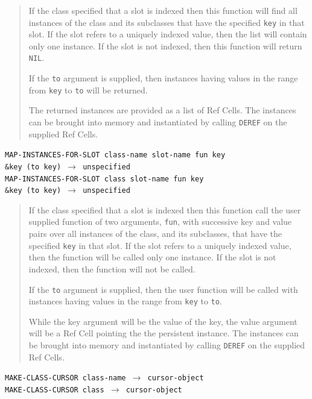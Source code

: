 \documentclass[article,oneside]{memoir}
\begin{document}
\begin{quote}
If the class specified that a slot is indexed then this function will find all instances of the class and its subclasses that have the specified \texttt{key} in that slot. If the slot refers to a uniquely indexed value, then the list will contain only one instance. If the slot is not indexed, then this function will return \texttt{NIL}. 

If the \texttt{to} argument is supplied, then instances having values in the range from \texttt{key} to \texttt{to} will be returned.

The returned instances are provided as a list of Ref Cells.  The instances can be brought into memory and instantiated by calling \texttt{DEREF} on the supplied Ref Cells.
\end{quote}

\noindent \texttt{MAP-INSTANCES-FOR-SLOT class-name slot-name fun key \\ \hspace*{10em} \&key (to key) $\rightarrow$ unspecified}\\
\noindent \texttt{MAP-INSTANCES-FOR-SLOT class slot-name fun key \\ \hspace*{10em} \&key (to key) $\rightarrow$ unspecified}

\begin{quote}
If the class specified that a slot is indexed then this function call the user supplied function of two arguments, \texttt{fun}, with successive key and value pairs over all instances of the class, and its subclasses, that have the specified \texttt{key} in that slot. If the slot refers to a uniquely indexed value, then the function will be called only one instance. If the slot is not indexed, then the function will not be called. 

If the \texttt{to} argument is supplied, then the user function will be called with instances having values in the range from \texttt{key} to \texttt{to}.

While the key argument will be the value of the key, the value argument will be a Ref Cell pointing the the persistent instance. The instances can be brought into memory and instantiated by calling \texttt{DEREF} on the supplied Ref Cells.
\end{quote}


\noindent \texttt{MAKE-CLASS-CURSOR class-name $\rightarrow$ cursor-object}\\
\noindent \texttt{MAKE-CLASS-CURSOR class $\rightarrow$ cursor-object}
\end{document}
